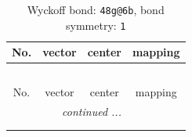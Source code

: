 \documentclass[fleqn,8pt]{jsarticle}
\begin{document}
\renewcommand{\arraystretch}{1.2}
\begin{longtable}{cccc}
\caption{Wyckoff bond: {\tt 48g@6b}, bond symmetry: {\tt 1}}
 \\
 \hline \hline
No. & vector & center & mapping \\ \hline \endfirsthead

\multicolumn{3}{l}{\tablename\ \thetable{}} \\
 \hline \hline
No. & vector & center & mapping \\ \hline \endhead

 \hline \hline
\multicolumn{3}{r}{\footnotesize\it continued ...} \\ \endfoot

 \hline \hline
\multicolumn{3}{r}{} \\ \endlastfoot


\end{longtable}
\end{document}
